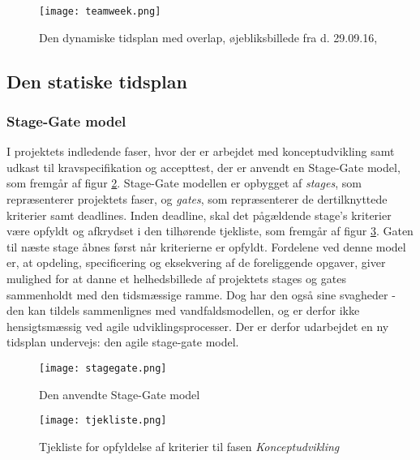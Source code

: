 \begin{figure}
\centering
\texttt{[image: teamweek.png]}	
\caption{Den dynamiske tidsplan med overlap, øjebliksbillede fra d. 29.09.16,}
\label{fig:teamweek}
\end{figure}

\subsection{Den statiske tidsplan}
\label{subsec:statisk}
\subsubsection{Stage-Gate model}
I projektets indledende faser, hvor der er arbejdet med konceptudvikling samt udkast til kravspecifikation og accepttest, der er anvendt en Stage-Gate model, som fremgår af figur \ref{fig:stagegate}. Stage-Gate modellen er opbygget af \textit{stages}, som repræsenterer projektets faser, og \textit{gates}, som repræsenterer de dertilknyttede kriterier samt deadlines. Inden deadline, skal det pågældende stage's kriterier være opfyldt og afkrydset i den tilhørende tjekliste, som fremgår af figur \ref{fig:tjekliste}. Gaten til næste stage åbnes først når kriterierne er opfyldt. Fordelene ved denne model er, at opdeling, specificering og eksekvering af de foreliggende opgaver, giver mulighed for at danne et helhedsbillede af projektets stages og gates sammenholdt med den tidsmæssige ramme. Dog har den også sine svagheder - den kan tildels sammenlignes med vandfaldsmodellen, og er derfor ikke hensigtsmæssig ved agile udviklingsprocesser. Der er derfor udarbejdet en ny tidsplan undervejs: den agile stage-gate model. 

\newpage
\begin{landscape}
\begin{figure}[htb]
\centering	
\texttt{[image: stagegate.png]}
\caption{Den anvendte Stage-Gate model}
\label{fig:stagegate}
\end{figure}
\end{landscape}

\begin{figure}[htb]
\centering
\texttt{[image: tjekliste.png]}
\caption{Tjekliste for opfyldelse af kriterier til fasen \textit{Konceptudvikling}}
\label{fig:tjekliste}
\end{figure}

